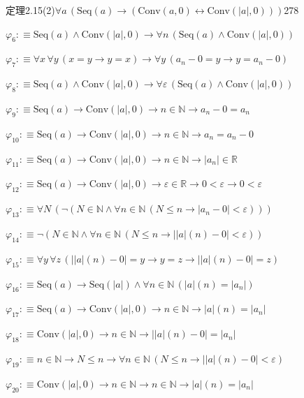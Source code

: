 \begin{fullproof}{定理2.15(2)}{$\forall a\,(\mathrm{Seq}(a) \to (\mathrm{Conv}(a,0) \leftrightarrow \mathrm{Conv}(\lvert a \rvert,0)))$}{278}
\begin{abbrevlist}
\item $\varphi_{6} :\equiv \mathrm{Seq}(a) \land \mathrm{Conv}(\lvert a \rvert,0) \to \forall n\,(\mathrm{Seq}(a) \land \mathrm{Conv}(\lvert a \rvert,0))$
\item $\varphi_{7} :\equiv \forall x\,\forall y\,(x = y \to y = x) \to \forall y\,(a_{n} - 0 = y \to y = a_{n} - 0)$
\item $\varphi_{8} :\equiv \mathrm{Seq}(a) \land \mathrm{Conv}(\lvert a \rvert,0) \to \forall \varepsilon\,(\mathrm{Seq}(a) \land \mathrm{Conv}(\lvert a \rvert,0))$
\item $\varphi_{9} :\equiv \mathrm{Seq}(a) \to \mathrm{Conv}(\lvert a \rvert,0) \to n \in \mathbb{N} \to a_{n} - 0 = a_{n}$
\item $\varphi_{10} :\equiv \mathrm{Seq}(a) \to \mathrm{Conv}(\lvert a \rvert,0) \to n \in \mathbb{N} \to a_{n} = a_{n} - 0$
\item $\varphi_{11} :\equiv \mathrm{Seq}(a) \to \mathrm{Conv}(\lvert a \rvert,0) \to n \in \mathbb{N} \to \lvert a_{n} \rvert \in \mathbb{R}$
\item $\varphi_{12} :\equiv \mathrm{Seq}(a) \to \mathrm{Conv}(\lvert a \rvert,0) \to \varepsilon \in \mathbb{R} \to 0 < \varepsilon \to 0 < \varepsilon$
\item $\varphi_{13} :\equiv \forall N\,(\neg (N \in \mathbb{N} \land \forall n \in \mathbb{N}\,(N \leq n \to \lvert a_{n} - 0 \rvert < \varepsilon)))$
\item $\varphi_{14} :\equiv \neg (N \in \mathbb{N} \land \forall n \in \mathbb{N}\,(N \leq n \to \lvert \lvert a \rvert(n) - 0 \rvert < \varepsilon))$
\item $\varphi_{15} :\equiv \forall y\,\forall z\,(\lvert \lvert a \rvert(n) - 0 \rvert = y \to y = z \to \lvert \lvert a \rvert(n) - 0 \rvert = z)$
\item $\varphi_{16} :\equiv \mathrm{Seq}(a) \to \mathrm{Seq}(\lvert a \rvert) \land \forall n \in \mathbb{N}\,(\lvert a \rvert(n) = \lvert a_{n} \rvert)$
\item $\varphi_{17} :\equiv \mathrm{Seq}(a) \to \mathrm{Conv}(\lvert a \rvert,0) \to n \in \mathbb{N} \to \lvert a \rvert(n) = \lvert a_{n} \rvert$
\item $\varphi_{18} :\equiv \mathrm{Conv}(\lvert a \rvert,0) \to n \in \mathbb{N} \to \lvert \lvert a \rvert(n) - 0 \rvert = \lvert a_{n} \rvert$
\item $\varphi_{19} :\equiv n \in \mathbb{N} \to N \leq n \to \forall n \in \mathbb{N}\,(N \leq n \to \lvert \lvert a \rvert(n) - 0 \rvert < \varepsilon)$
\item $\varphi_{20} :\equiv \mathrm{Conv}(\lvert a \rvert,0) \to n \in \mathbb{N} \to n \in \mathbb{N} \to \lvert a \rvert(n) = \lvert a_{n} \rvert$

\end{abbrevlist}
\end{fullproof}
